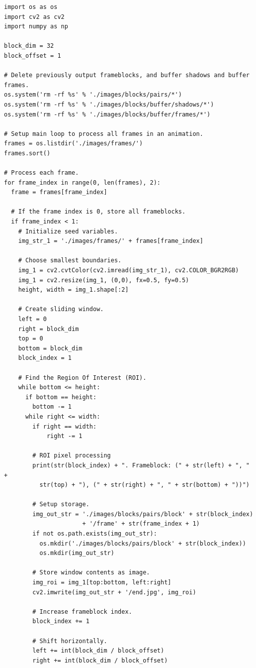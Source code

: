 \documentclass[conference]{IEEEtran}
\begin{document}
\footnotesize{
\begin{verbatim}
import os as os
import cv2 as cv2
import numpy as np

block_dim = 32
block_offset = 1

# Delete previously output frameblocks, and buffer shadows and buffer frames.
os.system('rm -rf %s' % './images/blocks/pairs/*')
os.system('rm -rf %s' % './images/blocks/buffer/shadows/*')
os.system('rm -rf %s' % './images/blocks/buffer/frames/*')

# Setup main loop to process all frames in an animation.
frames = os.listdir('./images/frames/')
frames.sort()

# Process each frame.
for frame_index in range(0, len(frames), 2):
  frame = frames[frame_index]

  # If the frame index is 0, store all frameblocks.
  if frame_index < 1:
    # Initialize seed variables.
    img_str_1 = './images/frames/' + frames[frame_index]

    # Choose smallest boundaries.
    img_1 = cv2.cvtColor(cv2.imread(img_str_1), cv2.COLOR_BGR2RGB)
    img_1 = cv2.resize(img_1, (0,0), fx=0.5, fy=0.5) 
    height, width = img_1.shape[:2]

    # Create sliding window.
    left = 0
    right = block_dim
    top = 0
    bottom = block_dim
    block_index = 1

    # Find the Region Of Interest (ROI).
    while bottom <= height:
      if bottom == height:
        bottom -= 1
      while right <= width:
        if right == width:
            right -= 1

        # ROI pixel processing
        print(str(block_index) + ". Frameblock: (" + str(left) + ", " +
          str(top) + "), (" + str(right) + ", " + str(bottom) + "))")
        
        # Setup storage.
        img_out_str = './images/blocks/pairs/block' + str(block_index)
                      + '/frame' + str(frame_index + 1)
        if not os.path.exists(img_out_str):
          os.mkdir('./images/blocks/pairs/block' + str(block_index))
          os.mkdir(img_out_str)

        # Store window contents as image.
        img_roi = img_1[top:bottom, left:right]
        cv2.imwrite(img_out_str + '/end.jpg', img_roi)

        # Increase frameblock index.
        block_index += 1
        
        # Shift horizontally.
        left += int(block_dim / block_offset)
        right += int(block_dim / block_offset)


\end{verbatim}}
\end{document}
